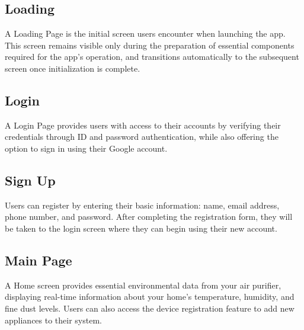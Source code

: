 \documentclass[conference]{IEEEtran}
\begin{document}
\subsection{Loading}
\vspace{0.5em}
A Loading Page is the initial screen users encounter when launching the app. This screen remains visible only during the preparation of essential components required for the app's operation, and transitions automatically to the subsequent screen once initialization is complete. 

\vspace{0.7em} %

\subsection{Login}
\vspace{0.5em}
A Login Page provides users with access to their accounts by verifying their credentials through ID and password authentication, while also offering the option to sign in using their Google account.

\vspace{0.7em} %

\subsection{Sign Up}
\vspace{0.5em}
Users can register by entering their basic information: name, email address, phone number, and password. After completing the registration form, they will be taken to the login screen where they can begin using their new account.

\vspace{0.7em} %

\subsection{Main Page}
\vspace{0.5em}
A Home screen provides essential environmental data from your air purifier, displaying real-time information about your home's temperature, humidity, and fine dust levels. Users can also access the device registration feature to add new appliances to their system.
\vspace{0.5em}
\end{document}

